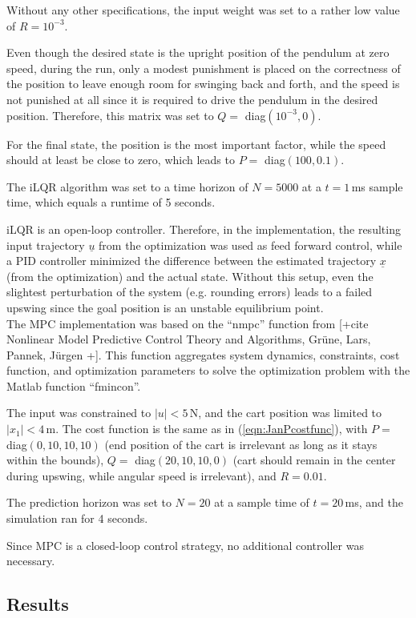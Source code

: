 \documentclass[letterpaper, 10 pt, conference]{ieeeconf}  %
\begin{document}
Without any other specifications, the input weight was set to a rather low value of $R=10^{-3}$. 

Even though the desired state is the upright position of the pendulum at zero speed, during the run, only a modest punishment is placed on the correctness of the position to leave enough room for swinging back and forth, and the speed is not punished at all since it is required to drive the pendulum in the desired position. Therefore, this matrix was set to $Q=$ diag$(10^{-3},0)$.

For the final state, the position is the most important factor, while the speed should at least be close to zero, which leads to $P=$ diag$(100,0.1)$.

The iLQR algorithm was set to a time horizon of $N=5000$ at a $t=1$\,ms sample time, which equals a runtime of 5 seconds.

iLQR is an open-loop controller. Therefore, in the implementation, the resulting input trajectory $\underline{u}$ from the optimization was used as feed forward control, while a PID controller minimized the difference between the estimated trajectory $\underline{x}$ (from the optimization) and the actual state.
Without this setup, even the slightest perturbation of the system (e.g. rounding errors) leads to a failed upswing since the goal position is an unstable equilibrium point.\\

 

The MPC implementation was based on the ``nmpc'' function from [+cite Nonlinear Model Predictive Control Theory and Algorithms, Grüne, Lars, Pannek, Jürgen +]. This function aggregates system dynamics, constraints, cost function, and optimization parameters to solve the optimization problem with the Matlab function ``fmincon''.

The input was constrained to $|u|<5$\,N, and the cart position was limited to $|x_1|<4$\,m. The cost function is the same as in (\ref{eqn:JanPcostfunc}), with $P=$ diag$(0,10,10,10)$ (end position of the cart is irrelevant as long as it stays within the bounds), $Q=$ diag$(20,10,10,0)$ (cart should remain in the center during upswing, while angular speed is irrelevant), and $R=0.01$. 

The prediction horizon was set to $N=20$ at a sample time of $t=20$\,ms, and the simulation ran for 4 seconds.

Since MPC is a closed-loop control strategy, no additional controller was necessary.
\subsection{Results}
\end{document}
